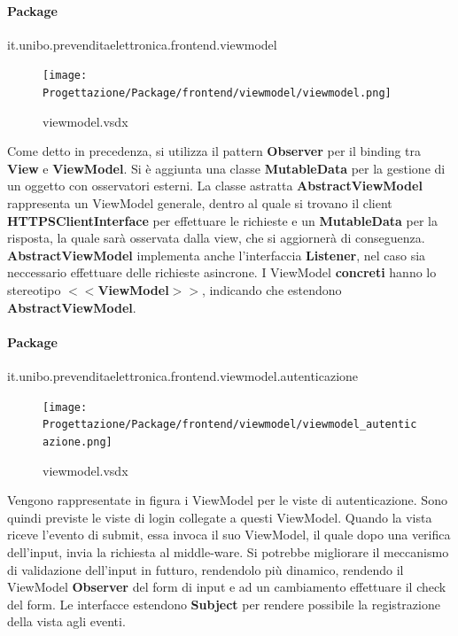 \documentclass[a4paper]{article}
\begin{document}
\newpage


\newpage

\paragraph{Package} it.unibo.prevenditaelettronica.frontend.viewmodel

\begin{figure}[H]
    \texttt{[image: Progettazione/Package/frontend/viewmodel/viewmodel.png]}
    \centering
    \caption{viewmodel.vsdx}
\end{figure}

Come detto in precedenza, si utilizza il pattern \textbf{Observer} per il binding tra \textbf{View} e \textbf{ViewModel}. Si è aggiunta una classe \textbf{MutableData} per la gestione di un oggetto con osservatori esterni. La classe astratta \textbf{AbstractViewModel} rappresenta un ViewModel generale, dentro al quale si trovano il client \textbf{HTTPSClientInterface} per effettuare le richieste e un \textbf{MutableData} per la risposta, la quale sarà osservata dalla view, che si aggiornerà di conseguenza. \textbf{AbstractViewModel} implementa anche l'interfaccia \textbf{Listener}, nel caso sia neccessario effettuare delle richieste asincrone. I ViewModel \textbf{concreti} hanno lo stereotipo $<<$\textbf{ViewModel}$>>$, indicando che estendono \textbf{AbstractViewModel}.

\newpage

\paragraph{Package} it.unibo.prevenditaelettronica.frontend.viewmodel.autenticazione


\begin{figure}[H]
    \texttt{[image: Progettazione/Package/frontend/viewmodel/viewmodel\_autenticazione.png]}
    \centering
    \caption{viewmodel.vsdx}
\end{figure}

Vengono rappresentate in figura i ViewModel per le viste di autenticazione. Sono quindi previste le viste di login collegate a questi ViewModel. Quando la vista riceve l'evento di submit, essa invoca il suo ViewModel, il quale dopo una verifica dell'input, invia la richiesta al middle-ware. Si potrebbe migliorare il meccanismo di validazione dell'input in futturo, rendendolo più dinamico, rendendo il ViewModel \textbf{Observer} del form di input e ad un cambiamento effettuare il check del form. Le interfacce estendono \textbf{Subject} per rendere possibile la registrazione della vista agli eventi.
\end{document}

